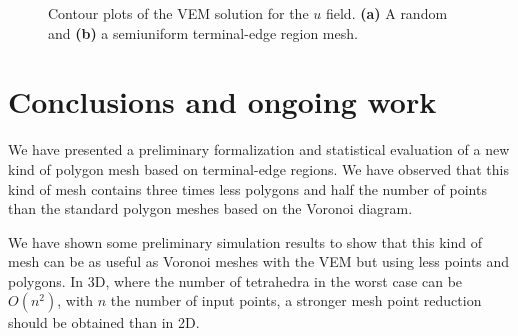 \documentclass[pdflatex,sn-mathphys]{sn-jnl}%
\theoremstyle{thmstyleone}%
\theoremstyle{thmstyletwo}%
\theoremstyle{thmstylethree}%
\begin{document}
\begin{figure}[!bth]
\centering     %
{} \hspace{0.5cm}
\caption{Contour plots of the VEM solution for the $u$ field. \textbf{(a)} A random and \textbf{(b)} a semiuniform terminal-edge region mesh.}
\label{figs:ContourPlots} 
\end{figure}


%
%
\section{Conclusions and ongoing work}
\label{sec:conclusions}

We have presented a preliminary formalization and  statistical evaluation of a new kind of polygon mesh based on terminal-edge regions. We have observed that this kind of mesh contains three times less polygons and half the number of points than the standard polygon meshes based on the Voronoi diagram. 

We have shown some preliminary simulation results to show that this kind of mesh can be  as useful as Voronoi meshes with the VEM but using less  points and polygons. In 3D, where the number of tetrahedra in the worst case can be $O(n^2)$, with $n$ the number of input points, a stronger mesh point reduction should be obtained than in 2D. 
\end{document}
